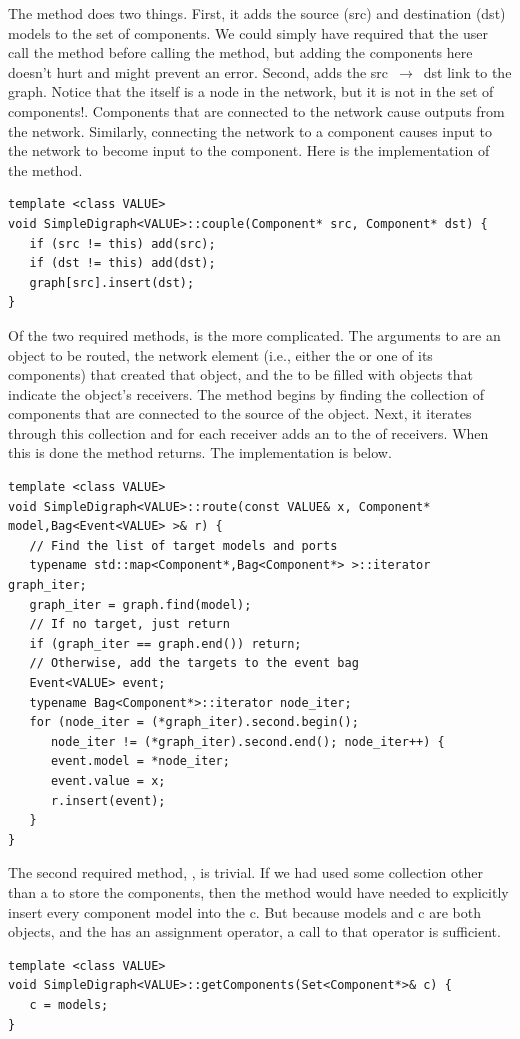 The  method does two things. First, it adds the source (src) and destination (dst) models to the set of components. We could simply have required that the user call the  method before calling the  method, but adding the components here doesn't hurt and might prevent an error. Second,  adds the \mbox{src $\rightarrow$ dst} link to the graph. Notice that the  itself is a node in the network, but it is not in the set of components!. Components that are connected to the network cause outputs from the network. Similarly, connecting the network to a component causes input to the network to become input to the component. Here is the implementation of the  method.
\begin{verbatim}
template <class VALUE>
void SimpleDigraph<VALUE>::couple(Component* src, Component* dst) { 
   if (src != this) add(src);
   if (dst != this) add(dst);
   graph[src].insert(dst);
}
\end{verbatim}

Of the two required methods,  is the more complicated. The arguments to  are an object to be routed, the network element (i.e., either the  or one of its components) that created that object, and the  to be filled with  objects that indicate the object's receivers. The method begins by finding the collection of components that are connected to the source of the object. Next, it iterates through this collection and for each receiver adds an  to the  of receivers. When this is done the method returns. The implementation is below.
\begin{verbatim}
template <class VALUE>
void SimpleDigraph<VALUE>::route(const VALUE& x, Component* model,Bag<Event<VALUE> >& r) {
   // Find the list of target models and ports
   typename std::map<Component*,Bag<Component*> >::iterator graph_iter;
   graph_iter = graph.find(model);
   // If no target, just return
   if (graph_iter == graph.end()) return;
   // Otherwise, add the targets to the event bag
   Event<VALUE> event;
   typename Bag<Component*>::iterator node_iter;
   for (node_iter = (*graph_iter).second.begin();
      node_iter != (*graph_iter).second.end(); node_iter++) {
      event.model = *node_iter;
      event.value = x;
      r.insert(event);
   }
}
\end{verbatim}

The second required method, , is trivial. If we had used some collection other than a  to store the components, then the method would have needed to explicitly insert every component model into the  c. But because models and c are both  objects, and the  has an assignment operator, a call to that operator is sufficient.
\begin{verbatim}
template <class VALUE>
void SimpleDigraph<VALUE>::getComponents(Set<Component*>& c) {
   c = models;
}
\end{verbatim}

